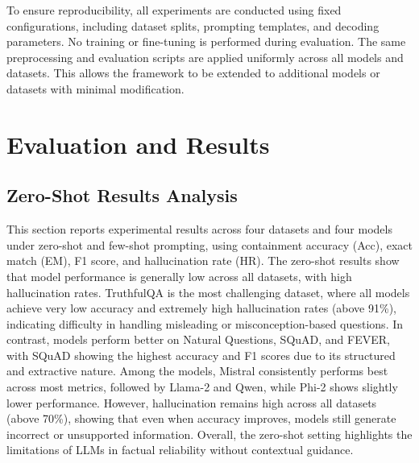 \documentclass[sigconf,nonacm]{acmart}
\begin{document}
To ensure reproducibility, all experiments are conducted using fixed configurations, including dataset splits, prompting templates, and decoding parameters. No training or fine-tuning is performed during evaluation. The same preprocessing and evaluation scripts are applied uniformly across all models and datasets. This allows the framework to be extended to additional models or datasets with minimal modification.

\section{Evaluation and Results}
\begingroup
\raggedbottom
\setlength{\intextsep}{6pt plus 2pt minus 2pt}

\subsection{Zero-Shot Results Analysis}

This section reports experimental results across four datasets and four models under zero-shot and few-shot prompting, using containment accuracy (Acc), exact match (EM), F1 score, and hallucination rate (HR). The zero-shot results show that model performance is generally low across all datasets, with high hallucination rates. TruthfulQA is the most challenging dataset, where all models achieve very low accuracy and extremely high hallucination rates (above 91\%), indicating difficulty in handling misleading or misconception-based questions. In contrast, models perform better on Natural Questions, SQuAD, and FEVER, with SQuAD showing the highest accuracy and F1 scores due to its structured and extractive nature. Among the models, Mistral consistently performs best across most metrics, followed by Llama-2 and Qwen, while Phi-2 shows slightly lower performance. However, hallucination remains high across all datasets (above 70\%), showing that even when accuracy improves, models still generate incorrect or unsupported information. Overall, the zero-shot setting highlights the limitations of LLMs in factual reliability without contextual guidance.
\end{document}
